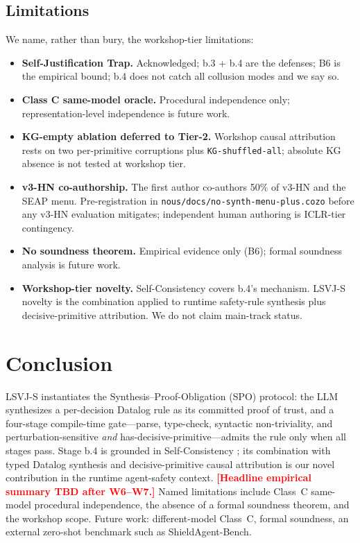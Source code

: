 \documentclass{article}
\theoremstyle{definition}
\newcommand{\placeholder}[1]{\textcolor{red}{\textbf{[#1]}}}
\begin{document}
\subsection{Limitations}
We name, rather than bury, the workshop-tier limitations:
\begin{itemize}[leftmargin=1.5em,nosep]
\item \textbf{Self-Justification Trap.} Acknowledged; b.3 + b.4 are
the defenses; B6 is the empirical bound; b.4 does not catch all
collusion modes and we say so.
\item \textbf{Class C same-model oracle.} Procedural independence
only; representation-level independence is future work.
\item \textbf{KG-empty ablation deferred to Tier-2.} Workshop causal
attribution rests on two per-primitive corruptions plus
\texttt{KG-shuffled-all}; absolute KG absence is not tested at
workshop tier.
\item \textbf{v3-HN co-authorship.} The first author co-authors 50\%
of v3-HN and the SEAP menu. Pre-registration in
\texttt{nous/docs/no-synth-menu-plus.cozo} before any v3-HN
evaluation mitigates; independent human authoring is ICLR-tier
contingency.
\item \textbf{No soundness theorem.} Empirical evidence only (B6);
formal soundness analysis is future work.
\item \textbf{Workshop-tier novelty.} Self-Consistency
\citep{wang2022selfconsistency} covers b.4's mechanism. LSVJ-S
novelty is the combination applied to runtime safety-rule synthesis
plus decisive-primitive attribution. We do not claim main-track
status.
\end{itemize}

\section{Conclusion}
\label{sec:conclusion}
LSVJ-S instantiates the Synthesis--Proof-Obligation (SPO) protocol:
the LLM synthesizes a per-decision Datalog rule as its committed
proof of trust, and a four-stage compile-time gate---parse,
type-check, syntactic non-triviality, and perturbation-sensitive
\emph{and} has-decisive-primitive---admits the rule only when all
stages pass. Stage b.4 is grounded in Self-Consistency
\citep{wang2022selfconsistency}; its combination with typed Datalog
synthesis and decisive-primitive causal attribution is our novel
contribution in the runtime agent-safety context.
\placeholder{Headline empirical summary TBD after W6--W7.}
Named limitations include Class~C same-model procedural
independence, the absence of a formal soundness theorem, and the
workshop scope. Future work: different-model Class~C, formal
soundness, an external zero-shot benchmark such as
ShieldAgent-Bench.
\end{document}
